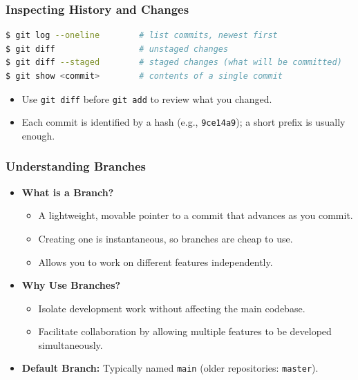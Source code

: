 \begin{frame}[fragile]
	\frametitle{Inspecting History and Changes}
\begin{lstlisting}[language=bash]
$ git log --oneline        # list commits, newest first
$ git diff                 # unstaged changes
$ git diff --staged        # staged changes (what will be committed)
$ git show <commit>        # contents of a single commit
\end{lstlisting}
	\begin{itemize}
		\item Use \texttt{git diff} before \texttt{git add} to review what you changed.
		\item Each commit is identified by a hash (e.g., \texttt{9ce14a9}); a short prefix is usually enough.
	\end{itemize}
\end{frame}


\begin{frame}
	\frametitle{Understanding Branches}
	\begin{itemize}
		\item \textbf{What is a Branch?}
		\begin{itemize}
			\item A lightweight, movable pointer to a commit that advances as you commit.
			\item Creating one is instantaneous, so branches are cheap to use.
			\item Allows you to work on different features independently.
		\end{itemize}
		\item \textbf{Why Use Branches?}
		\begin{itemize}
			\item Isolate development work without affecting the main codebase.
			\item Facilitate collaboration by allowing multiple features to be developed simultaneously.
		\end{itemize}
		\item \textbf{Default Branch:} Typically named \texttt{main} (older repositories: \texttt{master}).
	\end{itemize}
\end{frame}


